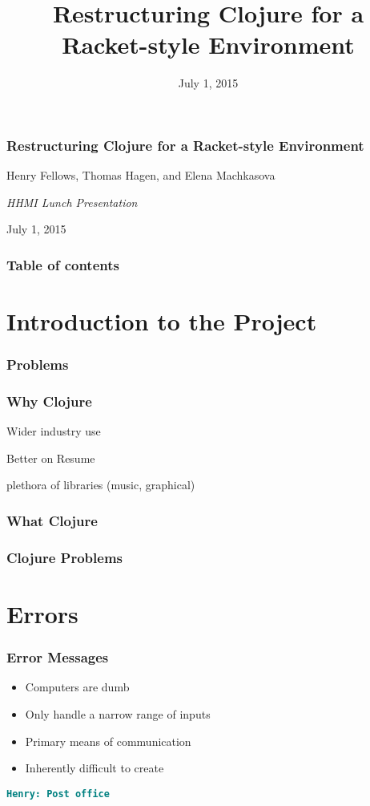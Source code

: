 \documentclass{beamer}
\newcommand{\comment}[1]{{\bf \tt  {#1}}}
\newcommand{\hfcomment}[1]{\textcolor{Teal}{\comment{Henry: {#1}}}}
\begin{document}
\title{Restructuring Clojure for a Racket-style Environment}
\date{July 1, 2015}

\begin{frame}
\frametitle {Restructuring Clojure for a Racket-style Environment}
{\centering
\noindent
Henry Fellows, Thomas Hagen, and Elena Machkasova \par

{\it 
HHMI Lunch Presentation\par
July 1, 2015\par}
}
\end{frame}

\begin{frame}
\frametitle{Table of contents}
\tableofcontents  
\end{frame}

\section{Introduction to the Project}

\begin{frame}
	\frametitle{Problems}
\end{frame}

\begin{frame}
	\frametitle{Why Clojure}
	\item Wider industry use
	\item Better on Resume
	\item plethora of libraries (music, graphical)
\end{frame}

\begin{frame}
	\frametitle{What Clojure}
\end{frame}

\begin{frame}
	\frametitle{Clojure Problems}
\end{frame}



\section{Errors}

\begin{frame}
	\frametitle{Error Messages}
	\begin{itemize}
		\item Computers are dumb
		\item Only handle a narrow range of inputs
		\item Primary means of communication
		\item Inherently difficult to create
	\end{itemize}
	\hfcomment{Post office}
\end{frame}
\end{document}
